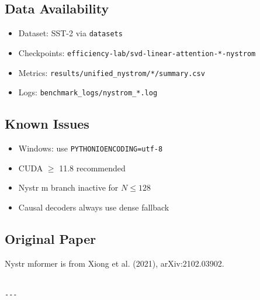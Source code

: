 \subsection{Data Availability}

\begin{itemize}
\item Dataset: SST-2 via \texttt{datasets}
\item Checkpoints: \texttt{efficiency-lab/svd-linear-attention-*-nystrom}
\item Metrics: \texttt{results/unified\_nystrom/*/summary.csv}
\item Logs: \texttt{benchmark\_logs/nystrom\_*.log}

\end{itemize}
\subsection{Known Issues}

\begin{itemize}
\item Windows: use \texttt{PYTHONIOENCODING=utf-8}
\item CUDA $\ge$ 11.8 recommended
\item Nystr m branch inactive for $N \leq 128$
\item Causal decoders always use dense fallback

\end{itemize}
\subsection{Original Paper}

Nystr mformer is from Xiong et al. (2021), arXiv:2102.03902.
\begin{lstlisting}

---
\end{lstlisting}
